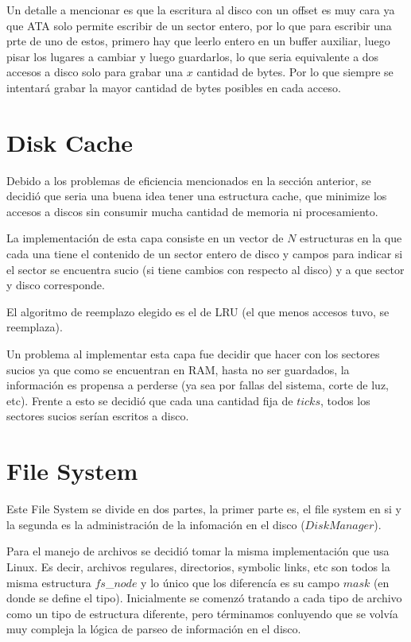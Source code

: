\documentclass[english]{article}
\begin{document}
Un detalle a mencionar es que la escritura al disco con un offset
es muy cara ya que ATA solo permite escribir de un sector entero,
por lo que para escribir una prte de uno de estos, primero hay que
leerlo entero en un buffer auxiliar, luego pisar los lugares a cambiar
y luego guardarlos, lo que seria equivalente a dos accesos a disco
solo para grabar una $x$ cantidad de bytes. Por lo que siempre se
intentará grabar la mayor cantidad de bytes posibles en cada acceso.

\pagebreak{}


\section{Disk Cache}

Debido a los problemas de eficiencia mencionados en la sección anterior,
se decidió que seria una buena idea tener una estructura cache, que
minimize los accesos a discos sin consumir mucha cantidad de memoria
ni procesamiento. 

La implementación de esta capa consiste en un vector de $N$ estructuras 
en la que cada una tiene el contenido de un sector entero de disco y campos 
para indicar si el sector se encuentra sucio (si tiene cambios con respecto 
al disco) y a que sector y disco corresponde.

El algoritmo de reemplazo elegido es el de LRU (el que menos accesos
tuvo, se reemplaza). 

Un problema al implementar esta capa fue decidir que hacer con los sectores
sucios ya que como se encuentran en RAM, hasta no ser guardados, la
información es propensa a perderse (ya sea por fallas del sistema,
corte de luz, etc). Frente a esto se decidió que cada una cantidad
fija de $ticks$, todos los sectores sucios serían escritos a disco. 

\pagebreak{}


\section{File System}

Este File System se divide en dos partes, la primer parte es, el
file system en si y la segunda es la administración de la infomación
en el disco ($DiskManager$).

Para el manejo de archivos se decidió tomar la misma implementación
que usa Linux. Es decir, archivos regulares, directorios, symbolic
links, etc son todos la misma estructura $fs$\_$node$ y lo único
que los diferencía es su campo $mask$ (en donde se define el tipo).
Inicialmente se comenzó tratando a cada tipo de archivo como un tipo
de estructura diferente, pero términamos conluyendo que se volvía
muy compleja la lógica de parseo de información en el disco.
\end{document}
